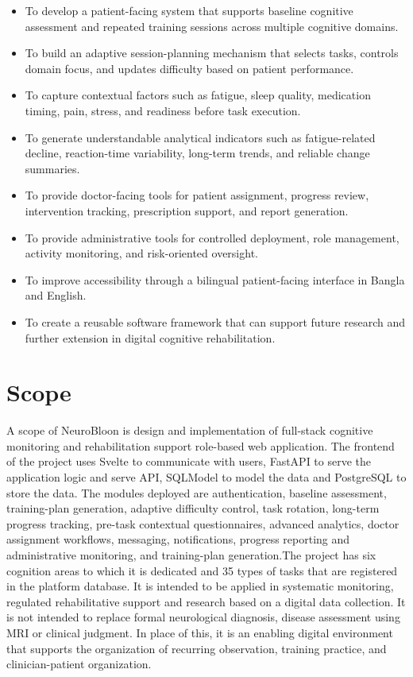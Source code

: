 \documentclass[12pt,a4paper]{report}
\begin{document}
\begin{itemize}[leftmargin=0.6in]
\item To develop a patient-facing system that supports baseline cognitive assessment and repeated training sessions across multiple cognitive domains.
\item To build an adaptive session-planning mechanism that selects tasks, controls domain focus, and updates difficulty based on patient performance.
\item To capture contextual factors such as fatigue, sleep quality, medication timing, pain, stress, and readiness before task execution.
\item To generate understandable analytical indicators such as fatigue-related decline, reaction-time variability, long-term trends, and reliable change summaries.
\item To provide doctor-facing tools for patient assignment, progress review, intervention tracking, prescription support, and report generation.
\item To provide administrative tools for controlled deployment, role management, activity monitoring, and risk-oriented oversight.
\item To improve accessibility through a bilingual patient-facing interface in Bangla and English.
\item To create a reusable software framework that can support future research and further extension in digital cognitive rehabilitation.
\end{itemize}

\section{Scope}
A scope of NeuroBloon is design and implementation of full-stack cognitive monitoring and rehabilitation support role-based web application. The frontend of the project uses Svelte to communicate with users, FastAPI to serve the application logic and serve API, SQLModel to model the data and PostgreSQL to store the data. The modules deployed are authentication, baseline assessment, training-plan generation, adaptive difficulty control, task rotation, long-term progress tracking, pre-task contextual questionnaires, advanced analytics, doctor assignment workflows, messaging, notifications, progress reporting and administrative monitoring, and training-plan generation.The project has six cognition areas to which it is dedicated and 35 types of tasks that are registered in the platform database. It is intended to be applied in systematic monitoring, regulated rehabilitative support and research based on a digital data collection. It is not intended to replace formal neurological diagnosis, disease assessment using MRI or clinical judgment. In place of this, it is an enabling digital environment that supports the organization of recurring observation, training practice, and clinician-patient organization.
\end{document}
